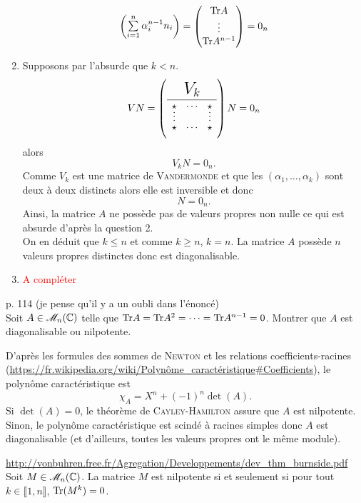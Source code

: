 \begin{solution}
\begin{enumerate}
\begin{align*}
\begin{pmatrix}
                \sum\limits_{i=1}^n \alpha_i^{n-1} n_i
            \end{pmatrix}
            = 
            \begin{pmatrix}
                \mathrm{Tr}{A} \\ \vdots \\ \mathrm{Tr}{A^{n-1}}
            \end{pmatrix}
            =
            0_n
        \end{align*}
        \item Supposons par l'absurde que $k < n$. \\
        $$V N = \vandermondepartiel N = 0_n$$
        alors 
        $$V_k N = 0_n.$$
        Comme $V_k$ est une matrice de \textsc{Vandermonde} et que les $(\alpha_1, \dots, \alpha_k)$ sont deux à deux distincts alors elle est inversible et donc
        $$N = 0_n.$$
        Ainsi, la matrice $A$ ne possède pas de valeurs propres non nulle ce qui est absurde d'après la question 2. \\
        On en déduit que $k \leqslant n$ et comme $k \geqslant n$, $k=n$. La matrice $A$ possède $n$ valeurs propres distinctes donc est diagonalisable.
        \item \textcolor{red}{A compléter}
        \end{enumerate}
\end{solution}

\begin{exercice}
    \cite{reduc_des_endo} p. 114 (je pense qu'il y a un oubli dans l'énoncé)\\
    Soit $A \in \mathscr{M}_n(\mathbb{C})$ telle que $\mathrm{Tr}{A} = \mathrm{Tr}{A^2} = \cdots = \mathrm{Tr}{A^{n-1}} = 0$. Montrer que $A$ est diagonalisable ou nilpotente. 
\end{exercice}

\begin{elem_sol}
    D'après les formules des sommes de \textsc{Newton} et les relations coefficients-racines (\url{https://fr.wikipedia.org/wiki/Polynôme_caractéristique#Coefficients}), le polynôme caractéristique est 
    $$\chi_A = X^n + (-1)^n \det(A).$$
    Si $\det(A) = 0$, le théorème de \textsc{Cayley}-\textsc{Hamilton} assure que $A$ est nilpotente. Sinon, le polynôme caractéristique est scindé à racines simples donc $A$ est diagonalisable (et d'ailleurs, toutes les valeurs propres ont le même module).
\end{elem_sol}

\begin{exercice}
    \url{http://vonbuhren.free.fr/Agregation/Developpements/dev_thm_burnside.pdf} \\
    Soit $M \in \mathscr{M}_n(\mathbb{C})$. La matrice $M$ est nilpotente si et seulement si pour tout $k \in \llbracket 1, n \rrbracket$, $\mathrm{Tr}(M^k) = 0$.
\end{exercice}

